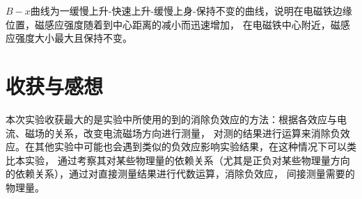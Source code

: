 \documentclass{article}
\begin{document}
    $B-x$曲线为一缓慢上升-快速上升-缓慢上身-保持不变的曲线，说明在电磁铁边缘位置，磁感应强度随着到中心距离的减小而迅速增加，
    在电磁铁中心附近，磁感应强度大小最大且保持不变。

    \section{收获与感想}
    本次实验收获最大的是实验中所使用的到的消除负效应的方法：根据各效应与电流、磁场的关系，改变电流磁场方向进行测量，
    对测的结果进行运算来消除负效应。在其他实验中可能也会遇到类似的负效应影响实验结果，在这种情况下可以类比本实验，
    通过考察其对某些物理量的依赖关系（尤其是正负对某些物理量方向的依赖关系），通过对直接测量结果进行代数运算，消除负效应，
    间接测量需要的物理量。
\end{document}
